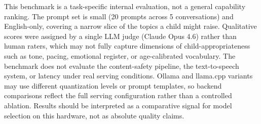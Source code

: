 This benchmark is a task-specific internal evaluation, not a general capability ranking. The prompt set is small (20 prompts across 5 conversations) and English-only, covering a narrow slice of the topics a child might raise. Qualitative scores were assigned by a single LLM judge (Claude Opus 4.6) rather than human raters, which may not fully capture dimensions of child-appropriateness such as tone, pacing, emotional register, or age-calibrated vocabulary. The benchmark does not evaluate the content-safety pipeline, the text-to-speech system, or latency under real serving conditions. Ollama and llama.cpp variants may use different quantization levels or prompt templates, so backend comparisons reflect the full serving configuration rather than a controlled ablation. Results should be interpreted as a comparative signal for model selection on this hardware, not as absolute quality claims.

